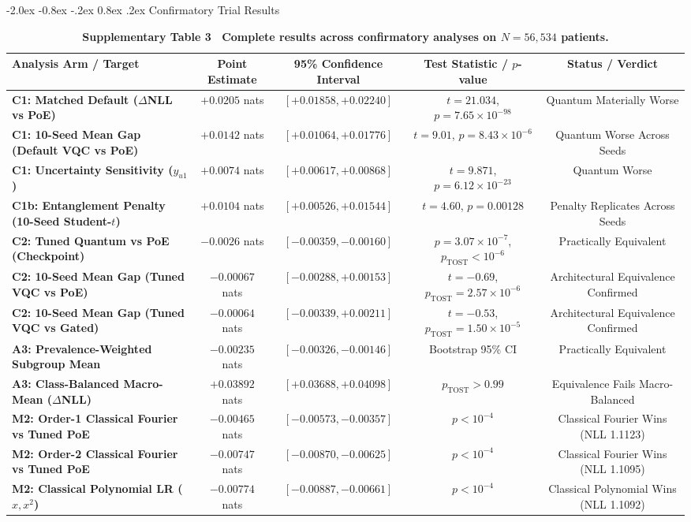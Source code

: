 \documentclass[10pt,a4paper]{article}
\makeatletter
\renewcommand{\subsection}{\@startsection{subsection}{2}{\z@}%
  {-2.0ex \@plus -0.8ex \@minus -.2ex}%
  {0.8ex \@plus.2ex}%
  {\normalfont\large\sffamily\bfseries\color{naturedark}}}
\makeatother
\begin{document}
\subsection{Confirmatory Trial Results}
\begin{table}[h]
\centering
\small
\caption*{\textbf{\textsf{Supplementary Table 3 \textbar\ Complete results across confirmatory analyses on $N=56,534$ patients.}}}
\begin{tabular}{lcccc}
\toprule
\textbf{Analysis Arm / Target} & \textbf{Point Estimate} & \textbf{95\% Confidence Interval} & \textbf{Test Statistic / $p$-value} & \textbf{Status / Verdict} \\
\midrule
\textbf{C1: Matched Default ($\Delta$NLL vs PoE)} & $+0.0205$ nats & $[+0.01858, +0.02240]$ & $t = 21.034$, $p = 7.65 \times 10^{-98}$ & Quantum Materially Worse \\
\textbf{C1: 10-Seed Mean Gap (Default VQC vs PoE)} & $+0.0142$ nats & $[+0.01064, +0.01776]$ & $t = 9.01$, $p = 8.43 \times 10^{-6}$ & Quantum Worse Across Seeds \\
\textbf{C1: Uncertainty Sensitivity ($y_{u1}$)} & $+0.0074$ nats & $[+0.00617, +0.00868]$ & $t = 9.871$, $p = 6.12 \times 10^{-23}$ & Quantum Worse \\
\textbf{C1b: Entanglement Penalty (10-Seed Student-$t$)} & $+0.0104$ nats & $[+0.00526, +0.01544]$ & $t = 4.60$, $p = 0.00128$ & Penalty Replicates Across Seeds \\
\textbf{C2: Tuned Quantum vs PoE (Checkpoint)} & $-0.0026$ nats & $[-0.00359, -0.00160]$ & $p = 3.07 \times 10^{-7}$, $p_{\text{TOST}} < 10^{-6}$ & Practically Equivalent \\
\textbf{C2: 10-Seed Mean Gap (Tuned VQC vs PoE)} & $-0.00067$ nats & $[-0.00288, +0.00153]$ & $t = -0.69$, $p_{\text{TOST}} = 2.57 \times 10^{-6}$ & Architectural Equivalence Confirmed \\
\textbf{C2: 10-Seed Mean Gap (Tuned VQC vs Gated)} & $-0.00064$ nats & $[-0.00339, +0.00211]$ & $t = -0.53$, $p_{\text{TOST}} = 1.50 \times 10^{-5}$ & Architectural Equivalence Confirmed \\
\textbf{A3: Prevalence-Weighted Subgroup Mean} & $-0.00235$ nats & $[-0.00326, -0.00146]$ & Bootstrap 95\% CI & Practically Equivalent \\
\textbf{A3: Class-Balanced Macro-Mean ($\Delta$NLL)} & $+0.03892$ nats & $[+0.03688, +0.04098]$ & $p_{\text{TOST}} > 0.99$ & Equivalence Fails Macro-Balanced \\
\textbf{M2: Order-1 Classical Fourier vs Tuned PoE} & $-0.00465$ nats & $[-0.00573, -0.00357]$ & $p < 10^{-4}$ & Classical Fourier Wins (NLL 1.1123) \\
\textbf{M2: Order-2 Classical Fourier vs Tuned PoE} & $-0.00747$ nats & $[-0.00870, -0.00625]$ & $p < 10^{-4}$ & Classical Fourier Wins (NLL 1.1095) \\
\textbf{M2: Classical Polynomial LR ($x, x^2$)} & $-0.00774$ nats & $[-0.00887, -0.00661]$ & $p < 10^{-4}$ & Classical Polynomial Wins (NLL 1.1092) \\
\bottomrule
\end{tabular}
\end{table}
\end{document}
